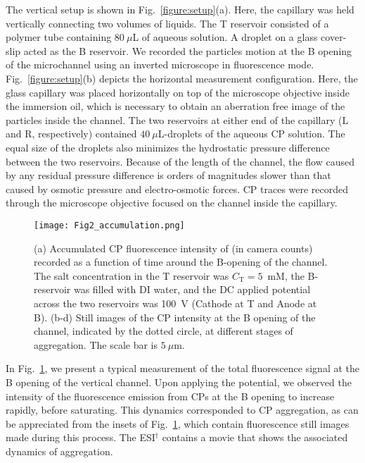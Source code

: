 \documentclass[twoside,twocolumn,9pt]{article}
\begin{document}
The vertical setup is shown in Fig.~\ref{figure:setup}(a). 
Here, the capillary was held vertically connecting two volumes of liquids. The T reservoir consisted of a polymer tube containing $80~\mu$L of aqueous solution. 
A droplet on a glass cover-slip acted as the B reservoir. 
We recorded the particles motion at the B opening of the microchannel using an inverted microscope in fluorescence mode. 
Fig.~\ref{figure:setup}(b) depicts the horizontal measurement configuration. Here, the glass capillary was placed horizontally on top of the microscope objective inside the immersion oil, which is necessary to obtain an aberration free image of the particles inside the channel. 
The two reservoirs at either end of the capillary (L and R, respectively) contained $40~\mu$L-droplets of the aqueous CP solution. 
The equal size of the droplets also minimizes the hydrostatic pressure difference between the two reservoirs. Because of the length of the channel, the flow caused by any residual pressure difference is orders of magnitudes slower than that caused by osmotic pressure and electro-osmotic forces.
CP traces were recorded through the microscope objective focused on the channel inside the capillary.

\begin{figure}[h]
 \centering\texttt{[image: Fig2\_accumulation.png]}
 \caption{\label{figure:Curve}(a) Accumulated CP fluorescence intensity of (in camera counts) recorded as a function of time around the B-opening of the channel. The salt concentration in the T reservoir was $C_{\mathrm{T}} = 5$~mM, the B-reservoir was filled with DI water, and the DC applied potential across the two reservoirs was 100~V (Cathode at T and Anode at B). (b-d) Still images of the CP intensity at the B opening of the channel, indicated by the dotted circle, at different stages of aggregation. The scale bar is $5~\mu$m.}
\end{figure}

In Fig.~\ref{figure:Curve}, we present a typical measurement of the total fluorescence signal at the B opening of the vertical channel. 
Upon applying the potential, we observed the intensity of the fluorescence emission from CPs at the B opening to increase rapidly, before saturating. 
This dynamics corresponded to CP aggregation, as can be appreciated from the insets of Fig.~\ref{figure:Curve}, which contain fluorescence still images made during this process. The ESI$^{\dag}$ contains a movie that shows the associated dynamics of aggregation.
\end{document}
